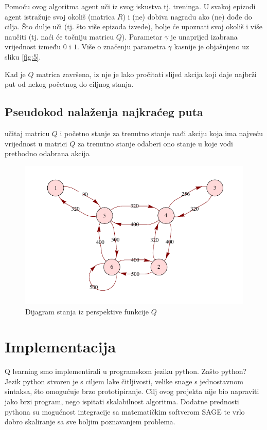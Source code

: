 \documentclass[    DIV=calc, paper=a4,fontsize=11pt, twocolumn]{scrartcl}                     %
\begin{document}
Pomoću ovog algoritma agent uči iz svog iskustva tj. treninga. U svakoj epizodi agent istražuje svoj okoliš (matrica $R$) i (ne) dobiva nagradu ako (ne) dođe do cilja. Što dulje uči (tj. što više epizoda izvede), bolje će upoznati svoj okoliš i više naučiti (tj. naći će točniju matricu $Q$).
Parametar $\gamma$ je unaprijed izabrana vrijednost između $0$ i $1$. Više o značenju parametra $\gamma$ kasnije je objašnjeno uz sliku \ref{fig:5}.

Kad je $Q$ matrica završena, iz nje je lako pročitati slijed akcija koji daje najbrži put od nekog početnog do ciljnog stanja.

\subsection*{Pseudokod nalaženja najkraćeg puta}
\begin{algorithmic}
\STATE učitaj matricu $Q$ i početno stanje
\STATE za trenutno stanje nađi akciju koja ima najveću vrijednost u matrici $Q$
\STATE za trenutno stanje odaberi ono stanje u koje vodi prethodno odabrana akcija
\ENDWHILE
\end{algorithmic}

\begin{figure}[h!]
\centering
\includegraphics[scale=0.9]{slike/Q.pdf}
\caption{Dijagram stanja iz perspektive funkcije $Q$}
\end{figure}


\section*{Implementacija}
Q learning smo implementirali u programskom jeziku python. Zašto python? Jezik python stvoren je s ciljem lake čitljivosti, velike snage s jednostavnom sintaksa, što omogućuje brzo prototipiranje.
Cilj ovog projekta nije bio napraviti jako brzi program, nego ispitati skalabilnost algoritma. Dodatne prednosti pythona su mogućnost integracije sa matematičkim softverom SAGE te vrlo dobro skaliranje sa sve boljim poznavanjem problema.
\end{document}
